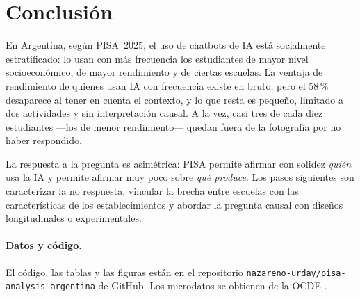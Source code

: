 \documentclass[11pt,a4paper]{article}
\begin{document}
\section{Conclusión}\label{sec:conclusion}

En Argentina, según PISA~2025, el uso de chatbots de IA está socialmente estratificado: lo usan con más frecuencia los estudiantes de mayor nivel socioeconómico, de mayor rendimiento y de ciertas escuelas. La ventaja de rendimiento de quienes usan IA con frecuencia existe en bruto, pero el 58\,\% desaparece al tener en cuenta el contexto, y lo que resta es pequeño, limitado a dos actividades y sin interpretación causal. A la vez, casi tres de cada diez estudiantes ---los de menor rendimiento--- quedan fuera de la fotografía por no haber respondido.

La respuesta a la pregunta es asimétrica: PISA permite afirmar con solidez \emph{quién} usa la IA y permite afirmar muy poco sobre \emph{qué produce}. Los pasos siguientes son caracterizar la no respuesta, vincular la brecha entre escuelas con las características de los establecimientos y abordar la pregunta causal con diseños longitudinales o experimentales.

\paragraph{Datos y código.} El código, las tablas y las figuras están en el repositorio \texttt{nazareno-urday/pisa-analysis-argentina} de GitHub. Los microdatos se obtienen de la OCDE \parencite{oecd2025db}.

\printbibliography[title={Referencias}]
\end{document}
